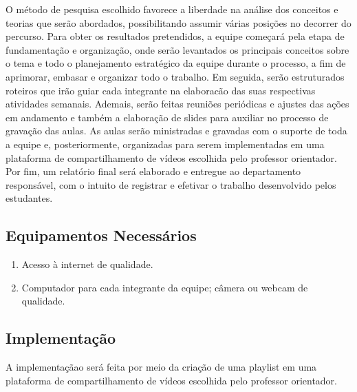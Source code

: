 \documentclass[a4paper,10pt]{article} %
\begin{document}
O método de pesquisa escolhido favorece a liberdade na análise dos conceitos e teorias que serão abordados, possibilitando assumir várias posições no decorrer do percurso. Para obter os resultados pretendidos, a equipe começará pela etapa de fundamentação e organização, onde serão levantados os principais conceitos sobre o tema e todo o planejamento estratégico da equipe durante o processo, a fim de aprimorar, embasar e organizar todo o trabalho. Em seguida, serão estruturados roteiros que irão guiar cada integrante na elaboracão das suas respectivas atividades semanais. Ademais, serão feitas reuniões periódicas e ajustes das ações em andamento e também a elaboração de slides para auxiliar no processo de gravação das aulas. As aulas serão ministradas e gravadas com o suporte de toda a equipe e, posteriormente, organizadas para serem implementadas em uma plataforma de compartilhamento de vídeos escolhida  pelo  professor orientador. Por fim, um relatório final será elaborado e entregue ao departamento responsável, com o intuito de registrar e efetivar o trabalho desenvolvido pelos estudantes.
 
\subsection{Equipamentos Necessários}

\begin{enumerate}
 \item Acesso à internet de qualidade. 
 \item Computador para cada integrante da equipe; câmera ou webcam de qualidade.
\end{enumerate}

\subsection{Implementação}
A implementaçãao será feita por meio da criação de uma playlist em uma plataforma de compartilhamento de vídeos escolhida pelo professor orientador.

\end{document}
